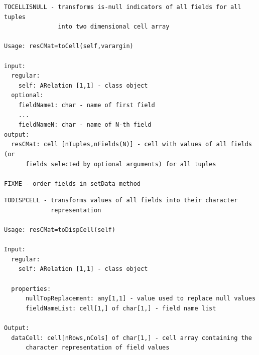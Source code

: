 \documentclass[letterpaper,10pt,english]{sphinxmanual}
\begin{document}
\begin{Verbatim}[commandchars=\\\{\}]
TOCELLISNULL - transforms is-null indicators of all fields for all tuples
               into two dimensional cell array

Usage: resCMat=toCell(self,varargin)

input:
  regular:
    self: ARelation [1,1] - class object
  optional:
    fieldName1: char - name of first field
    ...
    fieldNameN: char - name of N-th field
output:
  resCMat: cell [nTuples,nFields(N)] - cell with values of all fields (or
      fields selected by optional arguments) for all tuples

FIXME - order fields in setData method
\end{Verbatim}

\begin{Verbatim}[commandchars=\\\{\}]
TODISPCELL - transforms values of all fields into their character
             representation

Usage: resCMat=toDispCell(self)

Input:
  regular:
    self: ARelation [1,1] - class object

  properties:
      nullTopReplacement: any[1,1] - value used to replace null values
      fieldNameList: cell[1,] of char[1,] - field name list

Output:
  dataCell: cell[nRows,nCols] of char[1,] - cell array containing the
      character representation of field values
\end{Verbatim}
\end{document}
